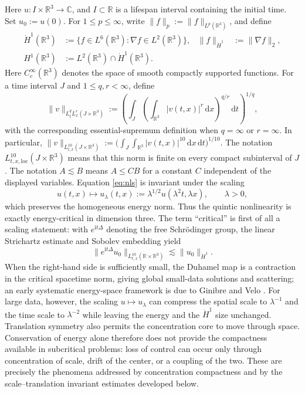 \documentclass{interact}
\numberwithin{equation}{section}
\theoremstyle{plain}
\theoremstyle{definition}
\theoremstyle{remark}
\newcommand{\R}{\mathbb R}
\newcommand{\C}{\mathbb C}
\newcommand{\ii}{\mathrm i}
\newcommand{\dd}{\,\mathrm d}
\begin{document}
Here $u:I\times\R^3\to\C$, and $I\subset\R$ is a lifespan interval containing the initial time. Set $u_0:=u(0)$. For $1\le p\le\infty$, write $\|f\|_p:=\|f\|_{L^p(\R^3)}$, and define
\begin{align*}
 \dot H^1(\R^3)
 &:=\{f\in L^6(\R^3):\nabla f\in L^2(\R^3)\},
 &\|f\|_{\dot H^1}&:=\|\nabla f\|_2,\\
 H^1(\R^3)&:=L^2(\R^3)\cap\dot H^1(\R^3).
\end{align*}
Here $C_c^\infty(\R^3)$ denotes the space of smooth compactly supported functions. For a time interval $J$ and $1\le q,r<\infty$, define
\[
 \|v\|_{L_t^qL_x^r(J\times\R^3)}
 :=\left(\int_J\left(\int_{\R^3}|v(t,x)|^r\dd x\right)^{q/r}\dd t\right)^{1/q},
\]
with the corresponding essential-supremum definition when $q=\infty$ or $r=\infty$. In particular,
$\|v\|_{L^{10}_{t,x}(J\times\R^3)}:=\bigl(\int_J\int_{\R^3}|v(t,x)|^{10}\dd x\dd t\bigr)^{1/10}$.
The notation $L^{10}_{t,x,\mathrm{loc}}(J\times\R^3)$ means that this norm is finite on every compact subinterval of $J$. The notation $A\lesssim B$ means $A\le CB$ for a constant $C$ independent of the displayed variables. Equation \eqref{eq:nls} is invariant under the scaling
\[
 u(t,x)\longmapsto u_\lambda(t,x)
 :=\lambda^{1/2}u(\lambda^2t,\lambda x),
 \qquad \lambda>0,
\]
which preserves the homogeneous energy norm. Thus the quintic nonlinearity is exactly energy-critical in dimension three. The term ``critical'' is first of all a scaling statement: with $e^{\ii t\Delta}$ denoting the free Schr\"odinger group, the linear Strichartz estimate and Sobolev embedding yield
\[
 \|e^{\ii t\Delta}u_0\|_{L^{10}_{t,x}(\R\times\R^3)}
 \lesssim \|u_0\|_{\dot H^1}.
\]
When the right-hand side is sufficiently small, the Duhamel map is a contraction in the critical spacetime norm, giving global small-data solutions and scattering; an early systematic energy-space framework is due to Ginibre and Velo \cite{GinibreVelo1985}. For large data, however, the scaling $u\mapsto u_\lambda$ can compress the spatial scale to $\lambda^{-1}$ and the time scale to $\lambda^{-2}$ while leaving the energy and the $\dot H^1$ size unchanged. Translation symmetry also permits the concentration core to move through space. Conservation of energy alone therefore does not provide the compactness available in subcritical problems: loss of control can occur only through concentration of scale, drift of the center, or a coupling of the two. These are precisely the phenomena addressed by concentration compactness and by the scale--translation invariant estimates developed below.
\end{document}
